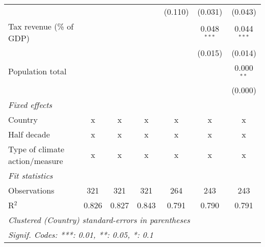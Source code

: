 \begin{tabular}{lcccccc}
                                                       &         &         &                & (0.110)        & (0.031)        & (0.043)\\   
   Tax revenue (\% of GDP)                             &         &         &                &                & 0.048$^{***}$  & 0.044$^{***}$\\   
                                                       &         &         &                &                & (0.015)        & (0.014)\\   
   Population total                                    &         &         &                &                &                & 0.000$^{**}$\\   
                                                       &         &         &                &                &                & (0.000)\\   
   \emph{Fixed effects}\\
   Country                                             & x       & x       & x              & x              & x              & x\\  
   Half decade                                         & x       & x       & x              & x              & x              & x\\  
   Type of climate action/measure                      & x       & x       & x              & x              & x              & x\\  
   \midrule \emph{Fit statistics}\\
   Observations                                        & 321     & 321     & 321            & 264            & 243            & 243\\  
   R$^2$                                               & 0.826   & 0.827   & 0.843          & 0.791          & 0.790          & 0.791\\  
   \midrule
   \multicolumn{7}{l}{\emph{Clustered (Country) standard-errors in parentheses}}\\
   \multicolumn{7}{l}{\emph{Signif. Codes: ***: 0.01, **: 0.05, *: 0.1}}\\
\end{tabular}
\par\endgroup


